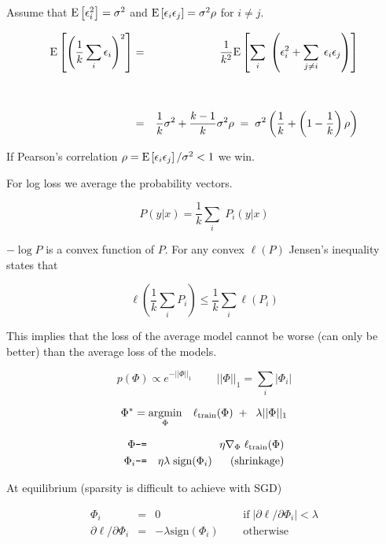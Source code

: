 {

Assume that $\mathrm{E}\left[\epsilon_i ^2\right] = \sigma^2$ and $\mathrm{E}\left[\epsilon_i \epsilon_j\right] = \sigma^2\rho$ for $i \not = j$.

\begin{eqnarray*}
  \mathrm{E}\left[\left(\frac{1}{k} \sum_i \epsilon_i\right)^2\right] & = & \frac{1}{k^2} \mathrm{E}\left[\sum_i\;\left(\epsilon_i^2 + \sum_{j \not = i}\;\epsilon_i\epsilon_j\right)\right] \\
  \\
  \\
  & = & \frac{1}{k} \sigma^2 + \frac{k-1}{k} \sigma^2\rho \;=\; \sigma^2\left(\frac{1}{k} + \left(1-\frac{1}{k}\right)\rho\right)
\end{eqnarray*}

\vfill
If Pearson's correlation $\rho = \mathrm{E}\left[\epsilon_i\epsilon_j\right]/\sigma^2 < 1$ we win.

\vfill
{}

For log loss we average the probability vectors.

\vfill
$$P(y|x) = \frac{1}{k} \sum_i \;P_i(y|x)$$

\vfill
$- \log P$ is a convex function of $P$.  For any convex $\ell(P)$ Jensen's inequality states that

$$\ell\left(\frac{1}{k} \sum_i P_i\right) \leq \frac{1}{k} \sum_i \ell(P_i)$$

\vfill
This implies that the loss of the average model cannot be worse (can only be better) than the average loss of the models.


$$p(\Phi) \propto e^{-||\Phi||_1} \;\;\;\;\;\;\;\;||\Phi||_1 = \sum_i |\Phi_i|$$

$$\Phi^* = \operatorname*{argmin}_\Phi \; \;\;\ell_{\mathrm{train}}(\Phi) \;+ \; \;\lambda||\Phi||_1$$

\begin{eqnarray*}
  \Phi & \mbox{\tt -=} & \eta \nabla_\Phi \; \ell_{\mathrm{train}}(\Phi) \\
  \Phi_i & \mbox{\tt -=} & \eta\lambda\; \mathrm{sign}(\Phi_i) \;\;\;\;\;\;\mbox{(shrinkage)}
\end{eqnarray*}

\vfill
At equilibrium \hfill (sparsity is difficult to achieve with SGD)

$$\begin{array}{rcll}
\Phi_i &  = & 0  & \;\;\;\;\;\mbox{if} \;\left|\partial \ell /\partial \Phi_i\right| <  \lambda \\
\partial \ell /\partial \Phi_i & = &  -\lambda \mathrm{sign}(\Phi_i) &\;\;\;\;\; \mbox{otherwise}
\end{array}$$

}
